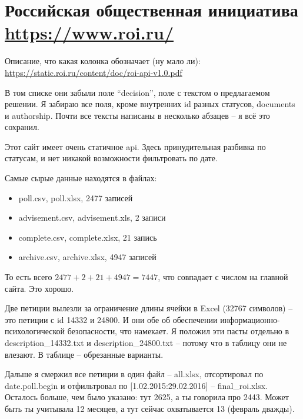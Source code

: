 \documentclass[11pt, a4paper]{article}
\begin{document}
\section*{Российская общественная инициатива \url{https://www.roi.ru/}}
Описание, что какая колонка обозначает (ну мало ли): 
\url{https://static.roi.ru/content/doc/roi-api-v1.0.pdf}

В том списке они забыли поле ``decision'', поле с текстом о предлагаемом решении.
Я забираю все поля, кроме внутренних id разных статусов, documents и authorship.
Почти все тексты написаны в несколько абзацев -- я всё это сохранил.

Этот сайт имеет очень статичное api. Здесь принудительная разбивка по статусам, и нет никакой возможности фильтровать по дате.

Самые сырые данные находятся в файлах:
\begin{itemize}
	\item poll.csv, poll.xlsx, 2477 записей
	\item advisement.csv, advisement.xls, 2 записи
	\item complete.csv, complete.xlsx, 21 запись
	\item archive.csv, archive.xlsx, 4947 записей
\end{itemize}
То есть всего $2477 + 2 + 21 + 4947 = 7447$, что совпадает с числом на главной сайта. Это хорошо.

Две петиции вылезли за ограничение длины ячейки в Excel (32767 символов) -- это петиции с id 14332 и 24800. И они обе об обеспечении информационно-психологической безопасности, что намекает. Я положил эти пасты отдельно в description\_14332.txt и description\_24800.txt -- потому что в таблицу они не влезают. В таблице -- обрезанные варианты.

Дальше я смержил все петиции в один файл -- all.xlsx, отсортировал по date.poll.begin и отфильтровал по [1.02.2015:29.02.2016] -- final\_roi.xlsx.
Осталось больше, чем было указано: тут 2625, а ты говорила про 2443. Может быть ты учитывала 12 месяцев, а тут сейчас охватывается 13 (февраль дважды).
\end{document}
